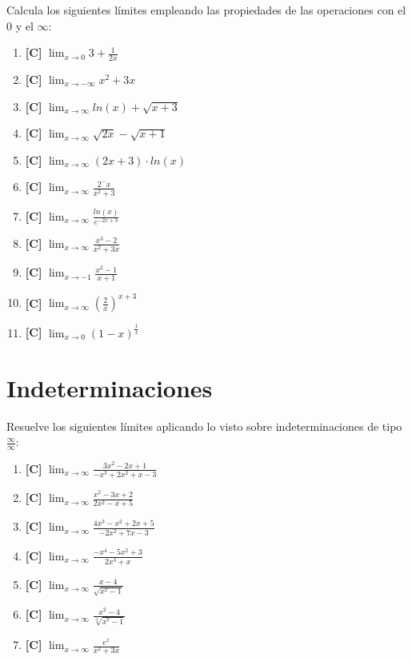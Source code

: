 \Exercicio Calcula los siguientes límites empleando las propiedades de las operaciones con el 0 y el $ \infty $:
\begin{enumerate}[topsep=0pt]
	\item \textbf{[C]} $ \lim_{x \to 0} 3 + \frac{1}{2x}$
	\item \textbf{[C]} $ \lim_{x \to -\infty}  x^2+3x$
	\item \textbf{[C]} $ \lim_{x \to \infty} ln(x) + \sqrt{x+3} $
	\item \textbf{[C]} $ \lim_{x \to \infty} \sqrt{2x} - \sqrt{x+1}  $
	\item \textbf{[C]} $ \lim_{x \to \infty} (2x + 3) \cdot ln(x) $
	\item \textbf{[C]} $ \lim_{x \to \infty} \frac{2^-x}{x^2 + 3}$
	\item \textbf{[C]} $ \lim_{x \to \infty} \frac{ln(x)}{e^{-2x+3}}$
	\item \textbf{[C]} $ \lim_{x \to \infty} \frac{x^3-2}{x^2+3x}$
	\item \textbf{[C]} $ \lim_{x \to -1} \frac{x^2-1}{x+1}$
	\item \textbf{[C]} $ \lim_{x \to \infty} (\frac{2}{x})^{x+3}$
	\item \textbf{[C]} $ \lim_{x \to 0} (1-x)^{\frac{1}{x}}$
\end{enumerate}

\section{Indeterminaciones}


\Exercicio Resuelve los siguientes límites aplicando lo visto sobre indeterminaciones de tipo $ \frac{\infty}{\infty} $:
\begin{enumerate}[topsep=0pt]
	\item \textbf{[C]} $ \lim_{x \to \infty} \frac{3x^2-2x+1}{-x^3+2x^2+x-3} $
	\item \textbf{[C]} $ \lim_{x \to \infty} \frac{x^2-3x+2}{2x^2-x+5} $
	\item \textbf{[C]} $ \lim_{x \to \infty} \frac{4x^3-x^2+2x+5}{-2x^2+7x-3} $
	\item \textbf{[C]} $ \lim_{x \to \infty} \frac{-x^4-5x^2+3}{2x^3+x} $
	\item \textbf{[C]} $ \lim_{x \to \infty} \frac{x-4}{\sqrt{x^2-1}} $
	\item \textbf{[C]} $ \lim_{x \to \infty} \frac{x^2-4}{\sqrt[3]{x^7-1}} $
	\item \textbf{[C]} $ \lim_{x \to \infty} \frac{e^x}{x^2 +3x} $
\end{enumerate}


